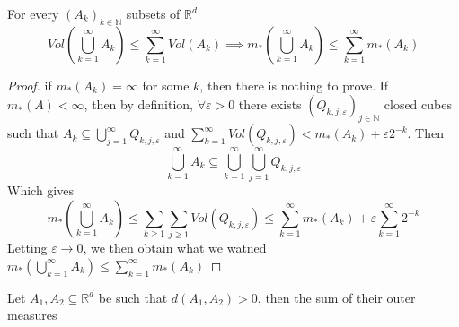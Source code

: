 \documentclass{tufte-handout}
\begin{document}
	\begin{proposition}
		For every $(A_k)_{k \in \mathbb{N}}$ subsets of $\mathbb{R}^d$ 
		\[ Vol\left(\bigcup_{k =1}^\infty A_k \right) \leq \sum_{k=1}^\infty Vol(A_k) \implies m_*\left(\bigcup_{k=1}^\infty A_k \right) \leq \sum_{k=1}^\infty m_*(A_k) \]

	\end{proposition}
	\begin{proof}
		if $m_*(A_k) = \infty$ for some $k$, then there is nothing to prove. If $m_*(A)  < \infty$, then by definition, $\forall \varepsilon > 0$ there exists $(Q_{k,j,\varepsilon})_{j \in \mathbb{N}}$ closed cubes such that $A_k \subseteq \bigcup_{j=1}^\infty Q_{k,j,\varepsilon}$ and $\sum_{k=1}^\infty Vol(Q_{k,j,\varepsilon}) < m_*(A_k) + \varepsilon 2^{-k}$. Then 
		$$\bigcup_{k=1}^\infty A_k \subseteq \bigcup_{k=1}^\infty \bigcup_{j=1}^\infty Q_{k,j,\varepsilon}$$
		Which gives 
		$$m_*\left(\bigcup_{k=1}^\infty A_k\right) \leq \sum_{k \geq 1} \sum_{j \geq 1} Vol(Q_{k,j,\varepsilon}) \leq \sum_{k=1}^\infty m_*(A_k) + \varepsilon \sum_{k=1}^\infty 2^{-k}$$
		Letting $\varepsilon \to 0$, we then obtain what we watned $m_*(\bigcup_{k=1}^\infty A_k) \leq \sum_{k=1}^\infty m_*(A_k) $
	\end{proof}
	\begin{proposition}
		Let $A_1, A_2 \subseteq \mathbb{R}^d$ be such that $d(A_1,A_2) > 0$, then the sum of their outer measures
	\end{proposition}	
\end{document}

